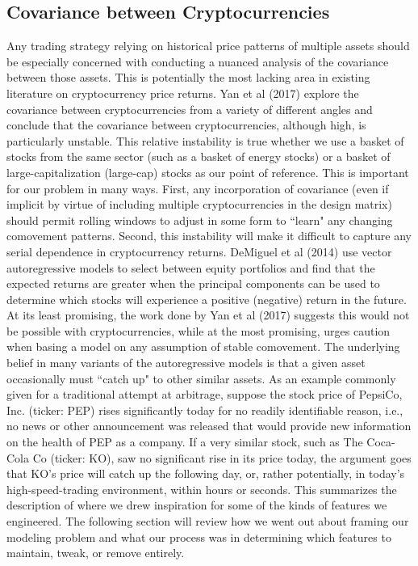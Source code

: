 \documentclass[12pt,twoside]{article}
\begin{document}
\subsection{Covariance between Cryptocurrencies}
Any trading strategy relying on historical price patterns of multiple assets should be especially concerned with conducting a nuanced analysis of the covariance between those assets. This is potentially the most lacking area in existing literature on cryptocurrency price returns. Yan et al (2017) explore the covariance between cryptocurrencies from a variety of different angles and conclude that the covariance between cryptocurrencies, although high, is particularly unstable. This relative instability is true whether we use a basket of stocks from the same sector (such as a basket of energy stocks) or a basket of large-capitalization (large-cap) stocks as our point of reference. This is important for our problem in many ways. First, any incorporation of covariance (even if implicit by virtue of including multiple cryptocurrencies in the design matrix) should permit rolling windows to adjust in some form to ``learn" any changing comovement patterns. Second, this instability will make it difficult to capture any serial dependence in cryptocurrency returns. DeMiguel et al (2014) use vector autoregressive models to select between equity portfolios and find that the expected returns are greater when the principal components can be used to determine which stocks will experience a positive (negative) return in the future. At its least promising, the work done by Yan et al (2017) suggests this would not be possible with cryptocurrencies, while at the most promising, urges caution when basing a model on any assumption of stable comovement.
\bigbreak
The underlying belief in many variants of the autoregressive models is that a given asset occasionally must ``catch up" to other similar assets. As an example commonly given for a traditional attempt at arbitrage, suppose the stock price of PepsiCo, Inc. (ticker: PEP) rises significantly today for no readily identifiable reason, i.e., no news or other announcement was released that would provide new information on the health of PEP as a company. If a very similar stock, such as The Coca-Cola Co (ticker: KO), saw no significant rise in its price today, the argument goes that KO's price will catch up the following day, or, rather potentially, in today's high-speed-trading environment, within hours or seconds.
\bigbreak
This summarizes the description of where we drew inspiration for some of the kinds of features we engineered. The following section will review how we went out about framing our modeling problem and what our process was in determining which features to maintain, tweak, or remove entirely.
\end{document}
